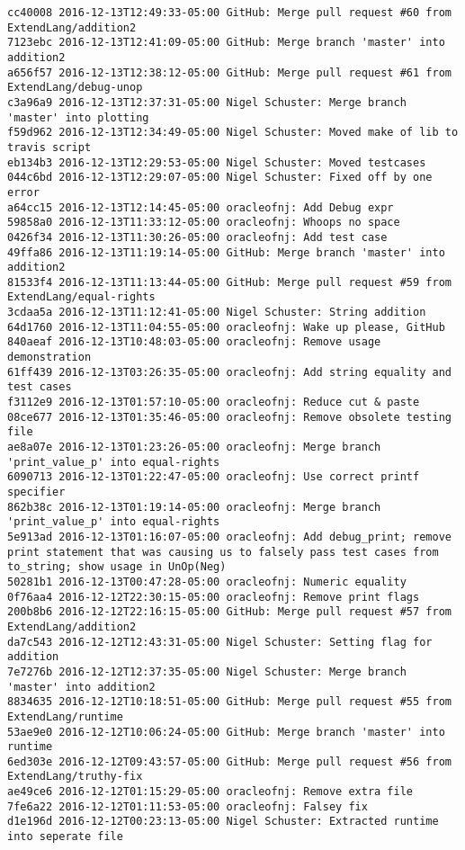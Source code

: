\begin{lstlisting}
cc40008 2016-12-13T12:49:33-05:00 GitHub: Merge pull request #60 from ExtendLang/addition2
7123ebc 2016-12-13T12:41:09-05:00 GitHub: Merge branch 'master' into addition2
a656f57 2016-12-13T12:38:12-05:00 GitHub: Merge pull request #61 from ExtendLang/debug-unop
c3a96a9 2016-12-13T12:37:31-05:00 Nigel Schuster: Merge branch 'master' into plotting
f59d962 2016-12-13T12:34:49-05:00 Nigel Schuster: Moved make of lib to travis script
eb134b3 2016-12-13T12:29:53-05:00 Nigel Schuster: Moved testcases
044c6bd 2016-12-13T12:29:07-05:00 Nigel Schuster: Fixed off by one error
a64cc15 2016-12-13T12:14:45-05:00 oracleofnj: Add Debug expr
59858a0 2016-12-13T11:33:12-05:00 oracleofnj: Whoops no space
0426f34 2016-12-13T11:30:26-05:00 oracleofnj: Add test case
49ffa86 2016-12-13T11:19:14-05:00 GitHub: Merge branch 'master' into addition2
81533f4 2016-12-13T11:13:44-05:00 GitHub: Merge pull request #59 from ExtendLang/equal-rights
3cdaa5a 2016-12-13T11:12:41-05:00 Nigel Schuster: String addition
64d1760 2016-12-13T11:04:55-05:00 oracleofnj: Wake up please, GitHub
840aeaf 2016-12-13T10:48:03-05:00 oracleofnj: Remove usage demonstration
61ff439 2016-12-13T03:26:35-05:00 oracleofnj: Add string equality and test cases
f3112e9 2016-12-13T01:57:10-05:00 oracleofnj: Reduce cut & paste
08ce677 2016-12-13T01:35:46-05:00 oracleofnj: Remove obsolete testing file
ae8a07e 2016-12-13T01:23:26-05:00 oracleofnj: Merge branch 'print_value_p' into equal-rights
6090713 2016-12-13T01:22:47-05:00 oracleofnj: Use correct printf specifier
862b38c 2016-12-13T01:19:14-05:00 oracleofnj: Merge branch 'print_value_p' into equal-rights
5e913ad 2016-12-13T01:16:07-05:00 oracleofnj: Add debug_print; remove print statement that was causing us to falsely pass test cases from to_string; show usage in UnOp(Neg)
50281b1 2016-12-13T00:47:28-05:00 oracleofnj: Numeric equality
0f76aa4 2016-12-12T22:30:15-05:00 oracleofnj: Remove print flags
200b8b6 2016-12-12T22:16:15-05:00 GitHub: Merge pull request #57 from ExtendLang/addition2
da7c543 2016-12-12T12:43:31-05:00 Nigel Schuster: Setting flag for addition
7e7276b 2016-12-12T12:37:35-05:00 Nigel Schuster: Merge branch 'master' into addition2
8834635 2016-12-12T10:18:51-05:00 GitHub: Merge pull request #55 from ExtendLang/runtime
53ae9e0 2016-12-12T10:06:24-05:00 GitHub: Merge branch 'master' into runtime
6ed303e 2016-12-12T09:43:57-05:00 GitHub: Merge pull request #56 from ExtendLang/truthy-fix
ae49ce6 2016-12-12T01:15:29-05:00 oracleofnj: Remove extra file
7fe6a22 2016-12-12T01:11:53-05:00 oracleofnj: Falsey fix
d1e196d 2016-12-12T00:23:13-05:00 Nigel Schuster: Extracted runtime into seperate file

\end{lstlisting}
